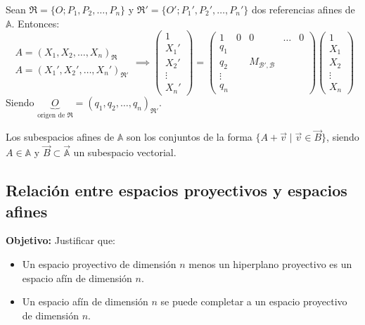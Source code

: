 \begin{proposición}
    Sean $\mathfrak{R} = \{O ; P_1, P_2, \ldots, P_n\}$ y $\mathfrak{R}' = \{O' ; P_1', P_2', \ldots, P_n'\}$ dos referencias afines de $\mathbb{A}$. Entonces:
    \[
        \begin{matrix}
            A = (X_1, X_2, \ldots, X_n)_{\mathfrak{R}} \\
            A = (X_1', X_2', \ldots, X_n')_{\mathfrak{R}'}
        \end{matrix} \implies
        \begin{pmatrix}
            1 \\ X_1' \\ X_2' \\ \vdots \\ X_n'
        \end{pmatrix} =
        \left(
        \begin{array}{c|cccc}
            1 & 0 & 0 & \ldots & 0 \\
            \hline
            q_1 & & & & \\
            q_2 & & M_{\mathcal{B}', \mathcal{B}} & & \\
            \vdots & & & & \\
            q_n & & & &
        \end{array}
        \right)
        \begin{pmatrix}
            1 \\ X_1 \\ X_2 \\ \vdots \\ X_n
        \end{pmatrix}
    \]
    Siendo $\underbrace{O}_{\text{origen de } \mathfrak{R}}= (q_1, q_2, \ldots, q_n)_{\mathfrak{R}'}$.
\end{proposición}

\begin{definición}
    Los subespacios afines de $\mathbb{A}$ son los conjuntos de la forma $ \{ A + \vec{v} \mid \vec{v} \in \vec{B} \}$, siendo $A \in \mathbb{A}$ y $\vec{B} \subset \vec{\mathbb{A}}$ un subespacio vectorial.
\end{definición}

\subsection{Relación entre espacios proyectivos y espacios afines}

\textbf{Objetivo: } Justificar que:
\begin{itemize}
    \item Un espacio proyectivo de dimensión $n$ menos un hiperplano proyectivo es un espacio afín de dimensión $n$.
    \item Un espacio afín de dimensión $n$ se puede completar a un espacio proyectivo de dimensión $n$.
\end{itemize}

